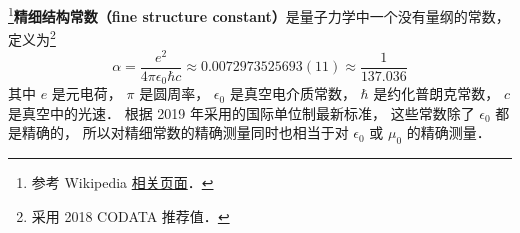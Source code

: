 

\footnote{参考 Wikipedia \href{https://en.wikipedia.org/wiki/Fine-structure_constant}{相关页面}．}\textbf{精细结构常数（fine structure constant）}是量子力学中一个没有量纲的常数， 定义为\footnote{采用 2018 CODATA 推荐值．}
\begin{equation}\label{FinStr_eq1}
\alpha = \frac{e^2}{4\pi\epsilon_0\hbar c} \approx 0.0072973525693(11) \approx \frac{1}{137.036}
\end{equation}
其中 $e$ 是元电荷， $\pi$ 是圆周率， $\epsilon_0$ 是真空电介质常数， $\hbar$ 是约化普朗克常数， $c$ 是真空中的光速． %
根据 2019 年采用的国际单位制最新标准， 这些常数除了 $\epsilon_0$ 都是精确的， 所以对精细常数的精确测量同时也相当于对 $\epsilon_0$ 或 $\mu_0$ 的精确测量．
